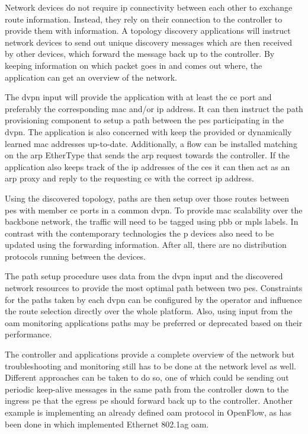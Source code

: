 \begin{description}[leftmargin=!,labelwidth=\widthof{\bfseries Topology Discovery}]
	\item[Topology Discovery] Network devices do not require \ac{ip} connectivity between each other to exchange route information. Instead, they rely on their connection to the controller to provide them with information. A topology discovery applications will instruct network devices to send out unique discovery messages which are then received by other devices, which forward the message back up to the controller. By keeping information on which packet goes in and comes out where, the application can get an overview of the network.
	\item[\ac{dvpn} Provisioning] The \ac{dvpn} input will provide the application with at least the \ac{ce} port and preferably the corresponding \ac{mac} and/or \ac{ip} address. It can then instruct the path provisioning component to setup a path between the \acp{pe} participating in the \ac{dvpn}. The application is also concerned with keep the provided or dynamically learned \ac{mac} addresses up-to-date. Additionally, a flow can be installed matching on the \ac{arp} EtherType that sends the \ac{arp} request towards the controller. If the application also keeps track of the \ac{ip} addresses of the \acp{ce} it can then act as an \ac{arp} proxy and reply to the requesting \ac{ce} with the correct \ac{ip} address.
	\item[Path Provisioning] Using the discovered topology, paths are then setup over those routes between \acp{pe} with member \ac{ce} ports in a common \ac{dvpn}. To provide \ac{mac} scalability over the backbone network, the traffic will need to be tagged using \ac{pbb} or \ac{mpls} labels. In contrast with the contemporary technologies the \ac{p} devices also need to be updated using the forwarding information. After all, there are no distribution protocols running between the devices.
	\item[Traffic Engineering] The path setup procedure uses data from the \ac{dvpn} input and the discovered network resources to provide the most optimal path between two \acp{pe}. Constraints for the paths taken by each \ac{dvpn} can be configured by the operator and influence the route selection directly over the whole platform. Also, using input from the \ac{oam} monitoring applications paths may be preferred or deprecated based on their performance.
	\item[\acs{oam}] The controller and applications provide a complete overview of the network but troubleshooting and monitoring still has to be done at the network level as well. Different approaches can be taken to do so, one of which could be sending out periodic keep-alive messages in the same path from the controller down to the ingress \ac{pe} that the egress \ac{pe} should forward back up to the controller. Another example is implementing an already defined \ac{oam} protocol in OpenFlow, as has been done in \cite{of-oam} which implemented Ethernet 802.1ag \ac{oam}.
\end{description}

